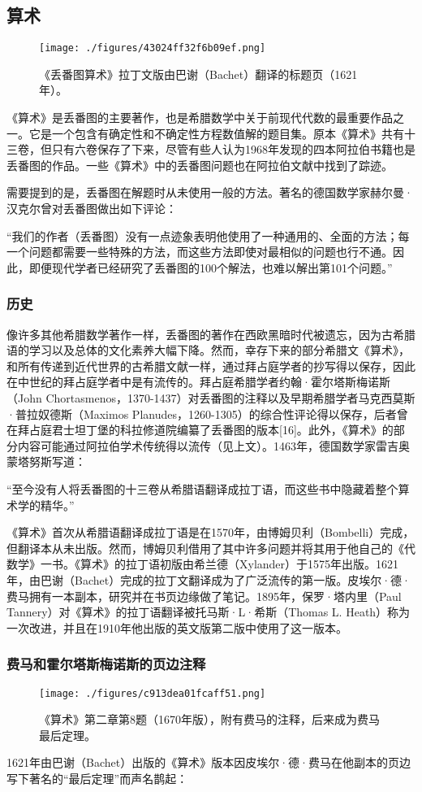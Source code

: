 \subsection{算术}
\begin{figure}[ht]
\centering
\texttt{[image: ./figures/43024ff32f6b09ef.png]}
\caption{《丢番图算术》拉丁文版由巴谢（Bachet）翻译的标题页（1621年）。} \label{fig_DPHT_1}
\end{figure}
《算术》是丢番图的主要著作，也是希腊数学中关于前现代代数的最重要作品之一。它是一个包含有确定性和不确定性方程数值解的题目集。原本《算术》共有十三卷，但只有六卷保存了下来，尽管有些人认为1968年发现的四本阿拉伯书籍也是丢番图的作品。一些《算术》中的丢番图问题也在阿拉伯文献中找到了踪迹。

需要提到的是，丢番图在解题时从未使用一般的方法。著名的德国数学家赫尔曼·汉克尔曾对丢番图做出如下评论：

“我们的作者（丢番图）没有一点迹象表明他使用了一种通用的、全面的方法；每一个问题都需要一些特殊的方法，而这些方法即使对最相似的问题也行不通。因此，即便现代学者已经研究了丢番图的100个解法，也难以解出第101个问题。”
\subsubsection{历史}
像许多其他希腊数学著作一样，丢番图的著作在西欧黑暗时代被遗忘，因为古希腊语的学习以及总体的文化素养大幅下降。然而，幸存下来的部分希腊文《算术》，和所有传递到近代世界的古希腊文献一样，通过拜占庭学者的抄写得以保存，因此在中世纪的拜占庭学者中是有流传的。拜占庭希腊学者约翰·霍尔塔斯梅诺斯（John Chortasmenos，1370-1437）对丢番图的注释以及早期希腊学者马克西莫斯·普拉奴德斯（Maximos Planudes，1260-1305）的综合性评论得以保存，后者曾在拜占庭君士坦丁堡的科拉修道院编纂了丢番图的版本[16]。此外，《算术》的部分内容可能通过阿拉伯学术传统得以流传（见上文）。1463年，德国数学家雷吉奥蒙塔努斯写道：

“至今没有人将丢番图的十三卷从希腊语翻译成拉丁语，而这些书中隐藏着整个算术学的精华。”

《算术》首次从希腊语翻译成拉丁语是在1570年，由博姆贝利（Bombelli）完成，但翻译本从未出版。然而，博姆贝利借用了其中许多问题并将其用于他自己的《代数学》一书。《算术》的拉丁语初版由希兰德（Xylander）于1575年出版。1621年，由巴谢（Bachet）完成的拉丁文翻译成为了广泛流传的第一版。皮埃尔·德·费马拥有一本副本，研究并在书页边缘做了笔记。1895年，保罗·塔内里（Paul Tannery）对《算术》的拉丁语翻译被托马斯·L·希斯（Thomas L. Heath）称为一次改进，并且在1910年他出版的英文版第二版中使用了这一版本。
\subsubsection{费马和霍尔塔斯梅诺斯的页边注释}
\begin{figure}[ht]
\centering
\texttt{[image: ./figures/c913dea01fcaff51.png]}
\caption{《算术》第二章第8题（1670年版），附有费马的注释，后来成为费马最后定理。} \label{fig_DPHT_2}
\end{figure}
1621年由巴谢（Bachet）出版的《算术》版本因皮埃尔·德·费马在他副本的页边写下著名的“最后定理”而声名鹊起：


